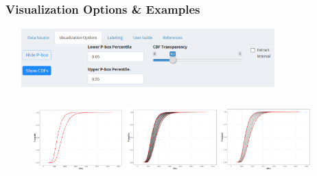 \documentclass[handout, xcolor=dvipsnames]{beamer}
\begin{document}
\subsection{}
\begin{frame}
	\frametitle{Visualization Options \& Examples}
	\begin{center} 
		\includegraphics[height=2.25cm,width=11cm]{figures/tab_vo.png}
	\end{center}
	\begin{figure}
	  \includegraphics[height=3cm,width=3.5cm]{figures/pbx.png}
	  \includegraphics[height=3cm,width=3.5cm]{figures/pbx_cdf_l.png}
	  \includegraphics[height=3cm,width=3.5cm]{figures/pbx_cdf_d.png}
	\end{figure}
\end{frame}
\end{document}
